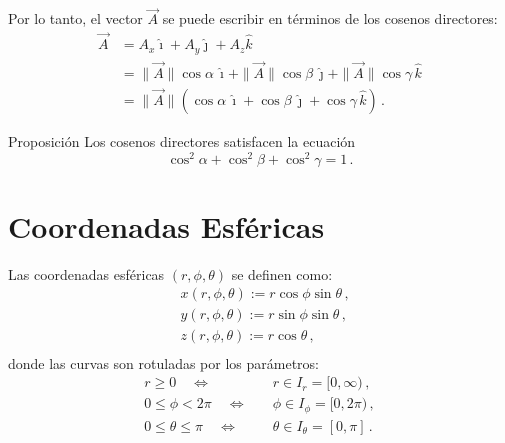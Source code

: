 \documentclass[../apunte_mecanica_clasica.tex]{subfiles}%
\begin{document}
Por lo tanto, el vector $\vec{A}$ se puede escribir en términos de los cosenos directores:
\begin{align*}
\vec{A} &= A_x \hat{\imath} + A_y \hat{\jmath} + A_z \hat{k} \\
& = \|\vec{A}\| \cos \alpha\, \hat{\imath} + \|\vec{A}\| \cos \beta\, \hat{\jmath} + \|\vec{A}\| \cos \gamma\, \hat{k} \\
&= \|\vec{A}\| \left( \cos \alpha\, \hat{\imath} + \cos \beta\, \hat{\jmath} + \cos \gamma\, \hat{k} \right) \,. 
\end{align*}

\begin{apuntebloque}{Proposición}
Los cosenos directores satisfacen la ecuación
\begin{equation*}
    \cos^2 \alpha + \cos^2\beta + \cos^2\gamma = 1 \,.
\end{equation*}
 
\end{apuntebloque}


\clearpage
\section{Coordenadas Esféricas}
Las coordenadas esféricas $(r, \phi, \theta)$ se definen como:
\begin{align*}
    &x(r, \phi, \theta) := r \cos\phi \sin\theta \,,\\
    &y(r, \phi, \theta) := r \sin\phi \sin\theta \,,\\
    &z(r, \phi, \theta) := r \cos\theta \,,\\
\end{align*}
donde las curvas son rotuladas por los parámetros:
\begin{align*}
    r \geq 0 \quad \Leftrightarrow& \quad r \in I_r = [0, \infty)\,, \\
    0 \leq \phi < 2\pi \quad \Leftrightarrow& \quad \phi \in I_\phi = [0, 2\pi) \,,\\
    0 \leq \theta \leq \pi \quad \Leftrightarrow& \quad \theta \in I_\theta = [0, \pi]\,.
\end{align*}
\end{document}
